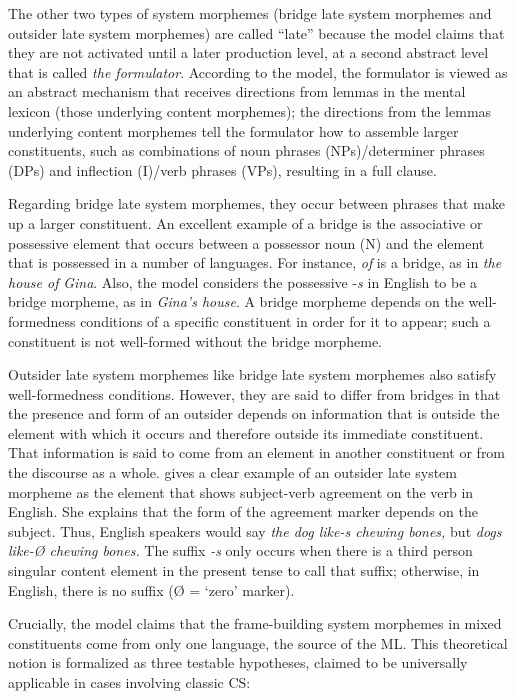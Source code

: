\documentclass[output=paper]{langsci/langscibook}
\begin{document}
The other two types of system morphemes (bridge late system morphemes and outsider late system morphemes) are called “late” because the model claims that they are not activated until a later production level, at a second abstract level that is called \textit{the formulator}. According to the model, the formulator is viewed as an abstract mechanism that receives directions from lemmas in the mental lexicon (those underlying content morphemes); the directions from the lemmas underlying content morphemes tell the formulator how to assemble larger constituents, such as combinations of noun phrases (NPs)/determiner phrases (DPs) and inflection (I)/verb phrases (VPs), resulting in a full clause. 

Regarding bridge late system morphemes, they occur between phrases that make up a larger constituent. An excellent example of a bridge is the associative or possessive element that occurs between a possessor noun (N) and the element that is possessed in a number of languages. For instance, \textit{of} is a bridge, as in \textit{the house of}\textbf{\textit{}} \textit{Gina}. Also, the model considers the possessive -\textit{s} in English to be a bridge morpheme, as in \textit{Gina’s house}. A bridge morpheme depends on the well-formedness conditions of a specific constituent in order for it to appear; such a constituent is not well-formed without the bridge morpheme. 

Outsider late system morphemes like bridge late system morphemes also satisfy well-formedness conditions. However, they are said to differ from bridges in that the presence and form of an outsider depends on information that is outside the element with which it occurs and therefore outside its immediate constituent. That information is said to come from an element in another constituent or from the discourse as a whole. \citet{MyersScotton2002,MyersScotton2006,MyersScotton2013} gives a clear example of an outsider late system morpheme as the element that shows subject-verb agreement on the verb in English. She explains that the form of the agreement marker depends on the subject. Thus, English speakers would say \textit{the dog like-s chewing bones,} but \textit{dogs like-Ø chewing bones.} The suffix \textit{-s} only occurs when there is a third person singular content element in the present tense to call that suffix; otherwise, in English, there is no suffix (Ø = ‘zero’ marker).

Crucially, the model claims that the frame-building system morphemes in mixed constituents come from only one language, the source of the ML. This theoretical notion is formalized as three testable hypotheses, claimed to be universally applicable in cases involving classic CS:
\end{document}
